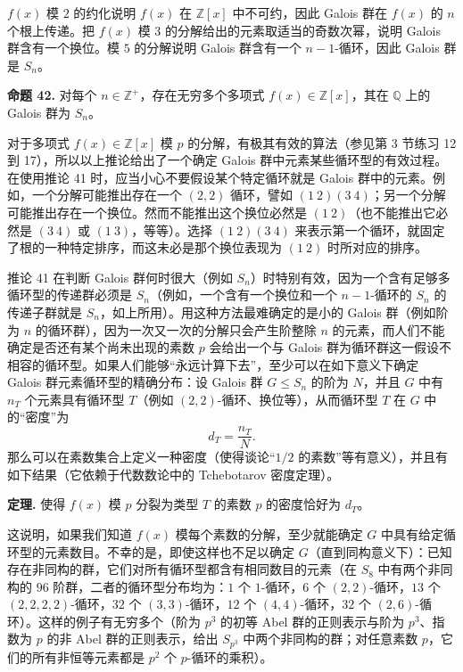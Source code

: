 $f(x)$ 模 $2$ 的约化说明 $f(x)$ 在 $\mathbb Z[x]$ 中不可约，因此 Galois 群在 $f(x)$ 的 $n$ 个根上传递。把 $f(x)$ 模 $3$ 的分解给出的元素取适当的奇数次幂，说明 Galois 群含有一个换位。模 $5$ 的分解说明 Galois 群含有一个 $n-1$-循环，因此 Galois 群是 $S_n$。

\noindent\textbf{命题 42.} 对每个 $n\in\mathbb Z^+$，存在无穷多个多项式 $f(x)\in\mathbb Z[x]$，其在 $\mathbb Q$ 上的 Galois 群为 $S_n$。

对于多项式 $f(x)\in\mathbb Z[x]$ 模 $p$ 的分解，有极其有效的算法（参见第 3 节练习 12 到 17），所以以上推论给出了一个确定 Galois 群中元素某些循环型的有效过程。在使用推论 41 时，应当小心不要假设某个特定循环就是 Galois 群中的元素。例如，一个分解可能推出存在一个 $(2,2)$ 循环，譬如 $(1\ 2)(3\ 4)$；另一个分解可能推出存在一个换位。然而不能推出这个换位必然是 $(1\ 2)$（也不能推出它必然是 $(3\ 4)$ 或 $(1\ 3)$，等等）。选择 $(1\ 2)(3\ 4)$ 来表示第一个循环，就固定了根的一种特定排序，而这未必是那个换位表现为 $(1\ 2)$ 时所对应的排序。

推论 41 在判断 Galois 群何时很大（例如 $S_n$）时特别有效，因为一个含有足够多循环型的传递群必须是 $S_n$（例如，一个含有一个换位和一个 $n-1$-循环的 $S_n$ 的传递子群就是 $S_n$，如上所用）。用这种方法最难确定的是小的 Galois 群（例如阶为 $n$ 的循环群），因为一次又一次的分解只会产生阶整除 $n$ 的元素，而人们不能确定是否还有某个尚未出现的素数 $p$ 会给出一个与 Galois 群为循环群这一假设不相容的循环型。如果人们能够“永远计算下去”，至少可以在如下意义下确定 Galois 群元素循环型的精确分布：设 Galois 群 $G\leq S_n$ 的阶为 $N$，并且 $G$ 中有 $n_T$ 个元素具有循环型 $T$（例如 $(2,2)$-循环、换位等），从而循环型 $T$ 在 $G$ 中的“密度”为
\[
d_T=\frac{n_T}{N}.
\]
那么可以在素数集合上定义一种密度（使得谈论“$1/2$ 的素数”等有意义），并且有如下结果（它依赖于代数数论中的 Tchebotarov 密度定理）。

\noindent\textbf{定理.} 使得 $f(x)$ 模 $p$ 分裂为类型 $T$ 的素数 $p$ 的密度恰好为 $d_T$。

这说明，如果我们知道 $f(x)$ 模每个素数的分解，至少就能确定 $G$ 中具有给定循环型的元素数目。不幸的是，即使这样也不足以确定 $G$（直到同构意义下）：已知存在非同构的群，它们对所有循环型都含有相同数目的元素（在 $S_8$ 中有两个非同构的 $96$ 阶群，二者的循环型分布均为：$1$ 个 $1$-循环，$6$ 个 $(2,2)$-循环，$13$ 个 $(2,2,2,2)$-循环，$32$ 个 $(3,3)$-循环，$12$ 个 $(4,4)$-循环，$32$ 个 $(2,6)$-循环）。这样的例子有无穷多个（阶为 $p^3$ 的初等 Abel 群的正则表示与阶为 $p^3$、指数为 $p$ 的非 Abel 群的正则表示，给出 $S_{p^3}$ 中两个非同构的群；对任意素数 $p$，它们的所有非恒等元素都是 $p^2$ 个 $p$-循环的乘积）。

